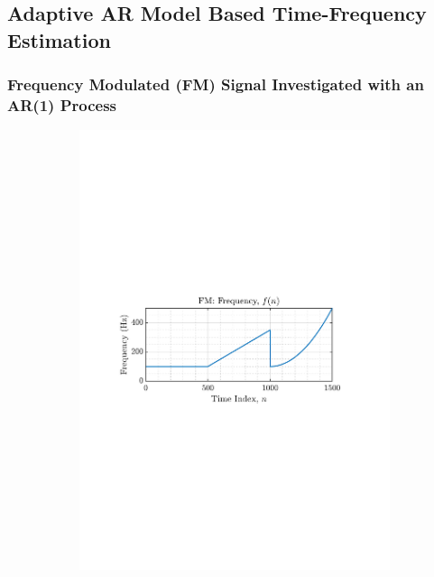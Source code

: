 \documentclass[12pt]{article}
\begin{document}
	\subsection{Adaptive AR Model Based Time-Frequency Estimation} \label{sec: 3-2-adaptive-ar-spectrum-estimate}
		\subsubsection{Frequency Modulated (FM) Signal Investigated with an AR(1) Process}
			\begin{figure}[H]
				\centering
				\begin{subfigure}{0.49\textwidth}
					\centering
					\includegraphics[trim={2.2cm 11.2cm 3.00cm  11.2cm}, clip, width=\textwidth]{../MATLAB/figures/q3_2a_fig01.pdf} 
					\captionsetup{justification=centering}
				\end{subfigure}

\end{figure}
\end{document}
